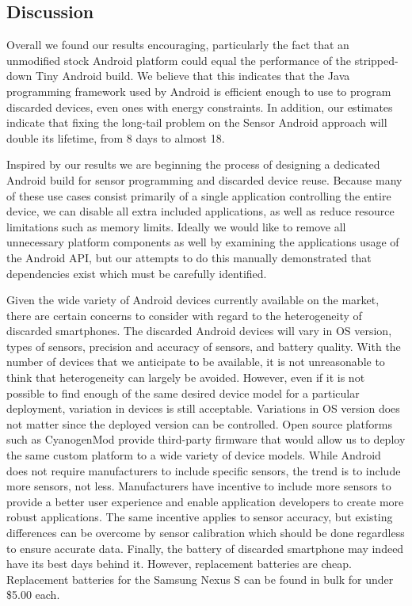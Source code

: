 \subsection{Discussion}

Overall we found our results encouraging, particularly the fact that an
unmodified stock Android platform could equal the performance of the
stripped-down Tiny Android build. We believe that this indicates that the
Java programming framework used by Android is efficient enough to use to
program discarded devices, even ones with energy constraints. In addition,
our estimates indicate that fixing the long-tail problem on the Sensor
Android approach will double its lifetime, from 8 days to almost 18.

Inspired by our results we are beginning the process of designing a dedicated
Android build for sensor programming and discarded device reuse. Because many
of these use cases consist primarily of a single application controlling the
entire device, we can disable all extra included applications, as well as
reduce resource limitations such as memory limits. Ideally we would like to
remove all unnecessary platform components as well by examining the
applications usage of the Android API, but our attempts to do this manually
demonstrated that dependencies exist which must be carefully identified.

Given the wide variety of Android devices currently available on the market,
there are certain concerns to consider with regard to the heterogeneity of
discarded smartphones.  The discarded Android devices will vary in OS version,
types of sensors, precision and accuracy of sensors, and battery quality.
With the number of devices that we anticipate to be available, it is not
unreasonable to think that heterogeneity can largely be avoided.  However,
even if it is not possible to find enough of the same desired device model for
a particular deployment,  variation in devices is still acceptable.  Variations
in OS version does not matter since the deployed version can be controlled.
Open source platforms such as CyanogenMod provide third-party firmware that
would allow us to deploy the same custom platform to a wide variety of device
models.  While Android does not require manufacturers to include specific sensors,
the trend is to include more sensors, not less.  Manufacturers have incentive to
include more sensors to provide a better user experience and enable application
developers to create more robust applications.  The same incentive applies to
sensor accuracy, but existing differences can be overcome by sensor calibration
which should be done regardless to ensure accurate data.  Finally, the battery
of discarded smartphone may indeed have its best days behind it.  However,
replacement batteries are cheap.  Replacement batteries for the Samsung Nexus S
can be found in bulk for under \$5.00 each.
